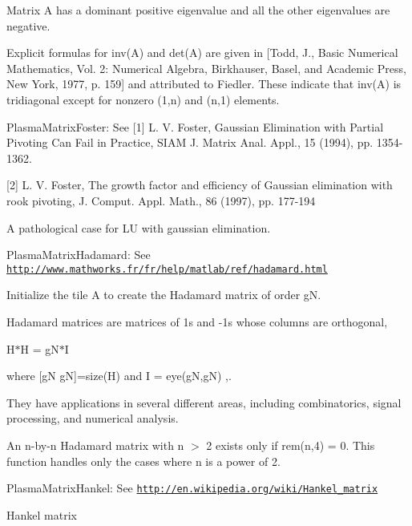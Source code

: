 Matrix A has a dominant positive eigenvalue and all the other eigenvalues are negative.

Explicit formulas for inv(\+A) and det(\+A) are given in \mbox{[}Todd, J., Basic Numerical Mathematics, Vol. 2\+: Numerical Algebra, Birkhauser, Basel, and Academic Press, New York, 1977, p. 159\mbox{]} and attributed to Fiedler. These indicate that inv(\+A) is tridiagonal except for nonzero (1,n) and (n,1) elements.

\begin{DoxyItemize}
\item Plasma\+Matrix\+Foster\+: See \mbox{[}1\mbox{]} L. V. Foster, Gaussian Elimination with Partial Pivoting Can Fail in Practice, S\+I\+A\+M J. Matrix Anal. Appl., 15 (1994), pp. 1354-\/1362.\end{DoxyItemize}
\mbox{[}2\mbox{]} L. V. Foster, The growth factor and efficiency of Gaussian elimination with rook pivoting, J. Comput. Appl. Math., 86 (1997), pp. 177-\/194

A pathological case for L\+U with gaussian elimination.

\begin{DoxyItemize}
\item Plasma\+Matrix\+Hadamard\+: See \href{http://www.mathworks.fr/fr/help/matlab/ref/hadamard.html}{\tt http\+://www.\+mathworks.\+fr/fr/help/matlab/ref/hadamard.\+html}\end{DoxyItemize}
Initialize the tile A to create the Hadamard matrix of order g\+N.

Hadamard matrices are matrices of 1\textquotesingle{}s and -\/1\textquotesingle{}s whose columns are orthogonal,

H\textquotesingle{}$\ast$\+H = g\+N$\ast$\+I

where \mbox{[}g\+N g\+N\mbox{]}=size(\+H) and I = eye(g\+N,g\+N) ,.

They have applications in several different areas, including combinatorics, signal processing, and numerical analysis.

An n-\/by-\/n Hadamard matrix with n $>$ 2 exists only if rem(n,4) = 0. This function handles only the cases where n is a power of 2.

\begin{DoxyItemize}
\item Plasma\+Matrix\+Hankel\+: See \href{http://en.wikipedia.org/wiki/Hankel_matrix}{\tt http\+://en.\+wikipedia.\+org/wiki/\+Hankel\+\_\+matrix}\end{DoxyItemize}
Hankel matrix

